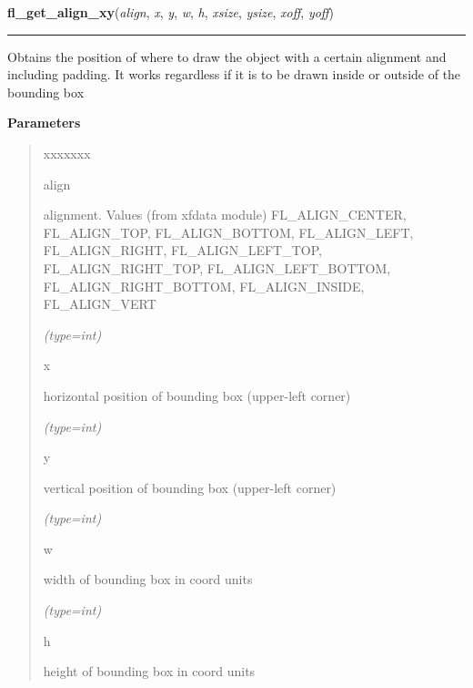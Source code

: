 \hspace{.8\funcindent}\begin{boxedminipage}{\funcwidth}

    \raggedright \textbf{fl\_get\_align\_xy}(\textit{align}, \textit{x}, \textit{y}, \textit{w}, \textit{h}, \textit{xsize}, \textit{ysize}, \textit{xoff}, \textit{yoff})

    \vspace{-1.5ex}

    \rule{\textwidth}{0.5\fboxrule}
\setlength{\parskip}{2ex}
    Obtains the position of where to draw the object with a certain 
    alignment and including padding. It works regardless if it is to be 
    drawn inside or outside of the bounding box

\setlength{\parskip}{1ex}
      \textbf{Parameters}
      \vspace{-1ex}

      \begin{quote}
        \begin{Ventry}{xxxxxxx}

          \item[align]

          alignment. Values (from xfdata module) FL\_ALIGN\_CENTER, 
          FL\_ALIGN\_TOP, FL\_ALIGN\_BOTTOM, FL\_ALIGN\_LEFT, 
          FL\_ALIGN\_RIGHT, FL\_ALIGN\_LEFT\_TOP, FL\_ALIGN\_RIGHT\_TOP, 
          FL\_ALIGN\_LEFT\_BOTTOM, FL\_ALIGN\_RIGHT\_BOTTOM, 
          FL\_ALIGN\_INSIDE, FL\_ALIGN\_VERT

            {\it (type=int)}

          \item[x]

          horizontal position of bounding box (upper-left corner)

            {\it (type=int)}

          \item[y]

          vertical position of bounding box (upper-left corner)

            {\it (type=int)}

          \item[w]

          width of bounding box in coord units

            {\it (type=int)}

          \item[h]

          height of bounding box in coord units


\end{Ventry}
\end{quote}
\end{boxedminipage}
